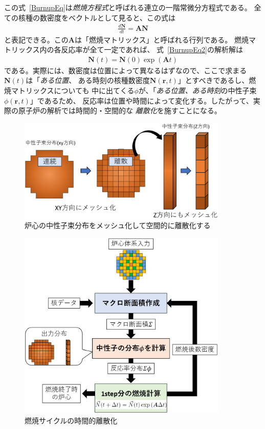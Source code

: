 この式~\eqref{BurnupEq}は\emph{燃焼方程式}と呼ばれる連立の一階常微分方程式である。
全ての核種の数密度をベクトルとして見ると、この式は
\begin{align}
  \frac{d\mathbf{N}}{dt} = \mathbf{A} \mathbf{N}  \label{BurnupEq2}
\end{align}
と表記できる。この$\mathbf{A}$は「燃焼マトリックス」と呼ばれる行列である。
燃焼マトリックス内の各反応率が全て一定であれば、
式~\eqref{BurnupEq2}の解析解は
\begin{align}
  \mathbf{N}(t) = \mathbf{N}(0) \exp{ (\mathbf{A} t) } \label{BurnupEqAnlSol}
\end{align}
である。実際には、数密度は位置によって異なるはずなので、ここで求まる$\mathbf{N}(t)$は「\emph{ある位置}、
ある時刻の核種数密度$\mathbf{N}(\mathbf{r},t)$」とすべきであるし、燃焼マトリックスについても
中に出てくる$\phi$が、「\emph{ある位置、ある時刻}の中性子束$\phi(\mathbf{r},t)$」であるため、
反応率は位置や時間によって変化する。したがって、実際の原子炉の解析では時間的・空間的な
\emph{離散化}を施すことになる。
\begin{figure}[htbp]
  \begin{center}
  \includegraphics[width=100mm]{figure/discretization.eps}
  \caption{炉心の中性子束分布をメッシュ化して空間的に離散化する}\label{discretization}
  \end{center}
\end{figure}
\begin{figure}[htbp]
  \begin{center}
  \includegraphics[width=100mm]{figure/time-discretization.eps}
  \caption{燃焼サイクルの時間的離散化}\label{time-discretization}
  \end{center}
\end{figure}
